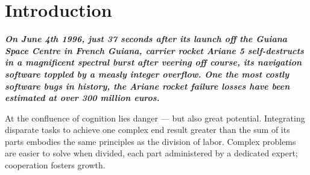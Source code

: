 \documentclass[12pt,a4paper,oneside,pdftex]{report}
\begin{document}
\label{pages-prelude}
\cleardoublepage

\startfirstchapter

\pagestyle{headings}


% 
\chapter{Introduction}
\label{chapter:introduction}


\begin{adjustwidth}{2.5em}{0pt}
\small
\textbf{\emph{On June 4th 1996, just 37 seconds after its launch off the Guiana Space Centre in French Guiana, carrier rocket Ariane 5 self-destructs in a magnificent spectral burst after veering off course, its navigation software toppled by a measly integer overflow. One the most costly software bugs in history, the Ariane rocket failure losses have been estimated at over 300 million euros. \citep{dowson1997ariane}}}
\normal
\end{adjustwidth}
\vspace{8 mm}

At the confluence of cognition lies danger --- but also great potential. Integrating disparate tasks to achieve one complex end result greater than the sum of its parts embodies the same principles as the division of labor. Complex problems are easier to solve when divided, each part administered by a dedicated expert; cooperation fosters growth. 
\end{document}
